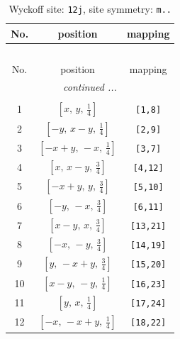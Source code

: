 \documentclass[fleqn,8pt]{jsarticle}
\begin{document}
\begin{longtable}{ccc}
\caption{Wyckoff site: {\tt 12j}, site symmetry: {\tt m..}}
 \\
 \hline \hline
No. & position & mapping \\ \hline \endfirsthead

\multicolumn{2}{l}{\tablename\ \thetable{}} \\
 \hline \hline
No. & position & mapping \\ \hline \endhead

 \hline \hline
\multicolumn{2}{r}{\footnotesize\it continued ...} \\ \endfoot

 \hline \hline
\multicolumn{2}{r}{} \\ \endlastfoot

1 & $\left[ x,\, y,\, \frac{1}{4} \right]$ & {\tt [1,8]} \\ \hline
2 & $\left[ - y,\, x - y,\, \frac{1}{4} \right]$ & {\tt [2,9]} \\ \hline
3 & $\left[ - x + y,\, - x,\, \frac{1}{4} \right]$ & {\tt [3,7]} \\ \hline
4 & $\left[ x,\, x - y,\, \frac{3}{4} \right]$ & {\tt [4,12]} \\ \hline
5 & $\left[ - x + y,\, y,\, \frac{3}{4} \right]$ & {\tt [5,10]} \\ \hline
6 & $\left[ - y,\, - x,\, \frac{3}{4} \right]$ & {\tt [6,11]} \\ \hline
7 & $\left[ x - y,\, x,\, \frac{3}{4} \right]$ & {\tt [13,21]} \\ \hline
8 & $\left[ - x,\, - y,\, \frac{3}{4} \right]$ & {\tt [14,19]} \\ \hline
9 & $\left[ y,\, - x + y,\, \frac{3}{4} \right]$ & {\tt [15,20]} \\ \hline
10 & $\left[ x - y,\, - y,\, \frac{1}{4} \right]$ & {\tt [16,23]} \\ \hline
11 & $\left[ y,\, x,\, \frac{1}{4} \right]$ & {\tt [17,24]} \\ \hline
12 & $\left[ - x,\, - x + y,\, \frac{1}{4} \right]$ & {\tt [18,22]} \\
\end{longtable}
\renewcommand{\arraystretch}{1.2}
\end{document}

